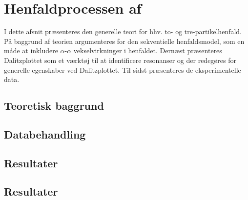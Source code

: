 \chapter{Henfaldprocessen af \Carb}
\label{cha:sekventielt-henfald}

I dette afsnit præsenteres den generelle teori for hhv. to- og tre-partikelhenfald. På baggrund af
teorien argumenteres for den sekventielle henfaldsmodel, som en måde at inkludere
$\alpha$-$\alpha$ vekselvirkninger i henfaldet. Dernæst præsenteres Dalitzplottet som et værktøj til at
identificere  resonanser og der redegøres for generelle egenskaber ved
Dalitzplottet. Til sidst præsenteres de eksperimentelle data. 

\section{Teoretisk baggrund}
\label{sec:sekventiel-teo}








\section{Databehandling}
\label{sec:sek-data}




\section{Resultater}




\section{Resultater}
\label{sec:sekv-konklusion}


